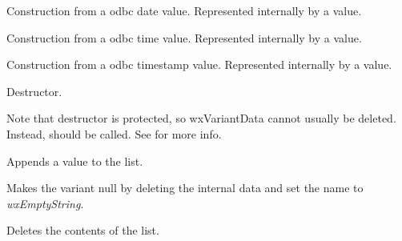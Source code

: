 Construction from a odbc date value.  Represented internally by a  value.


Construction from a odbc time value.  Represented internally by a  value.


Construction from a odbc timestamp value.  Represented internally by a  value.

\label{wxvariantdtor}


Destructor.

Note that destructor is protected, so wxVariantData cannot usually
be deleted. Instead,  should be called.
See  for more info.


\label{wxvariantappend}


Appends a value to the list.

\label{wxvariantclear}


Makes the variant null by deleting the internal data and
set the name to {\it wxEmptyString}.

\label{wxvariantclearlist}


Deletes the contents of the list.


\label{wxvariantconvert}







